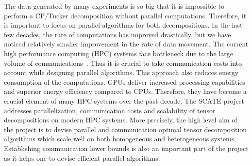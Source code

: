 \documentclass[a4paper,11pt]{article}
\begin{document}
	
	The data generated by many experiments is so big that it is impossible to perform a CP/Tucker decomposition without parallel computations. Therefore, it is important to focus on parallel algorithms for both decompositions.
	In the last few decades, the rate of computations has improved drastically, but we have noticed relatively smaller improvement in the rate of data movement. The current high performance computing (HPC) systems face bottleneck due to the large volume of communications~\cite{DOE-Report-2014}. Thus it is crucial to take communication costs into account while designing parallel algorithms. This approach also reduces energy consumption of the computations. GPUs deliver increased processing capabilities and superior energy efficiency compared to CPUs. Therefore, they have become a crucial element of many HPC systems over the past decade. The SCATE project addresses parallelization, communication costs and scalability of tensor decompositions on modern HPC systems. More precisely, the high level aim of the project is to devise parallel and communication optimal tensor decomposition algorithms which scale well on both homogeneous and heterogeneous systems. Establishing communication lower bounds is also an important part of the project as it helps one to devise efficient parallel algorithms.
	
	
	
	
	
\end{document}
